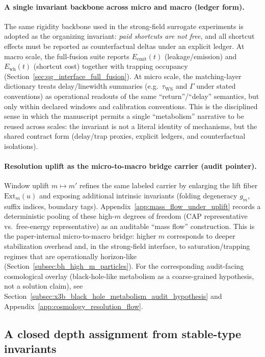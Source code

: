 \paragraph{A single invariant backbone across micro and macro (ledger form).}
\AuditTag The same rigidity backbone used in the strong-field surrogate experiments is adopted as the organizing invariant:
\emph{paid shortcuts are not free}, and all shortcut effects must be reported as counterfactual deltas under an explicit ledger.
At macro scale, the full-fusion suite reports $E_{\mathrm{emit}}(t)$ (leakage/emission) and $E_{\mathrm{wh}}(t)$ (shortcut cost) together with trapping occupancy (Section~\ref{sec:qg_interface_full_fusion}).
At micro scale, the matching-layer dictionary treats delay/linewidth summaries (e.g.\ $\tau_{\mathrm{WS}}$ and $\Gamma$ under stated conventions) as operational readouts of the same ``return''/``delay'' semantics, but only within declared windows and calibration conventions.
This is the disciplined sense in which the manuscript permits a single ``metabolism'' narrative to be reused across scales:
the invariant is not a literal identity of mechanisms, but the shared contract form (delay/trap proxies, explicit ledgers, and counterfactual isolations).

\paragraph{Resolution uplift as the micro-to-macro bridge carrier (audit pointer).}
\AuditTag Window uplift $m\mapsto m'$ refines the same labeled carrier by enlarging the lift fiber $\mathrm{Ext}_m(u)$
and exposing additional intrinsic invariants (folding degeneracy $g_m$, suffix indices, boundary tags).
Appendix~\ref{app:mass_flow_under_uplift} records a deterministic pooling of these high-$m$ degrees of freedom
(CAP representative vs.\ free-energy representative) as an auditable ``mass flow'' construction.
This is the paper-internal micro-to-macro bridge: higher $m$ corresponds to deeper stabilization overhead and, in the strong-field interface,
to saturation/trapping regimes that are operationally horizon-like (Section~\ref{subsec:bh_high_m_particles}).
For the corresponding audit-facing cosmological overlay (black-hole-like metabolism as a coarse-grained hypothesis, not a solution claim),
see Section~\ref{subsec:x3b_black_hole_metabolism_audit_hypothesis} and Appendix~\ref{app:cosmology_resolution_flow}.

\subsection{A closed depth assignment from stable-type invariants}
\label{subsec:mass_depth_assignment}


